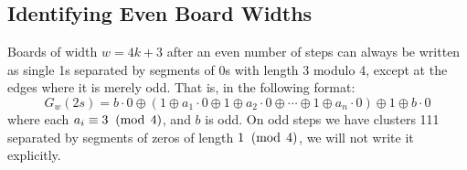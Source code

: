 \documentclass[12pt,letterpaper]{article}
\begin{document}
\subsection{Identifying Even Board Widths}

\begin{prop}\label{onesSepByOddZeros} %
  Boards of width $w=4k+3$ after an even number of steps can always be written as single 1s separated by segments of 0s with length 3 modulo 4, except at the edges where it is merely odd. That is, in the following format:
  $$G_w(2s)=b\cdot 0 \oplus (1 \oplus a_1\cdot 0 \oplus 1\oplus a_2\cdot 0\oplus\cdots \oplus 1\oplus a_n\cdot 0) \oplus 1 \oplus b\cdot 0$$
  where each $a_i\equiv 3 \;\;(\operatorname{mod}\;4)$, and $b$ is odd.
  On odd steps we have clusters 111 separated by segments of zeros of length $1\;\;(\operatorname{mod}\;4)$, we will not write it explicitly.
\end{prop}
\end{document}
